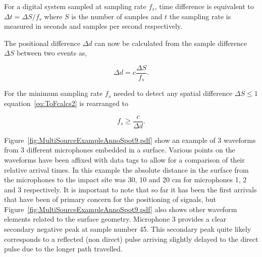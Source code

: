 For a digital system sampled at sampling rate $f_s$, time difference is equivalent to $\Delta t = \Delta S/f_s$ where $S$ is the number of samples and $t$ the sampling rate is measured in seconds and samples per second respectively.

The positional difference $\Delta d$ can now be calculated from the sample difference $\Delta S$ between two events as,

\begin{equation}\label{eq:ToFcalcs2}
\Delta d  = c \frac{\Delta S}{f_s}.
\end{equation}

For the minimum sampling rate $f_s$ needed to detect any spatial difference $\Delta S \leq 1$ equation~\ref{eq:ToFcalcs2} is rearranged to

\begin{equation}\label{eq:ToFcalcs3}
f_s  \geq \frac{c}{\Delta d}.
\end{equation}

Figure~\ref{fig:MultiSourceExampleAnnoSpot9.pdf} show an example of 3 waveforms from 3 different microphones embedded in a surface. Various points on the waveforms have been affixed with data tags to allow for a comparison of their relative arrival times. In this example the absolute distance in the surface from the microphones to the impact site was 30, 10 and 20 cm for microphones 1, 2 and 3 respectively. It is important to note that so far it has been the first arrivals that have been of primary concern for the positioning of signals, but Figure~\ref{fig:MultiSourceExampleAnnoSpot9.pdf} also shows other waveform elements related to the surface geometry. Microphone 3 provides a clear secondary negative peak at sample number 45. This secondary peak quite likely corresponds to a reflected (non direct) pulse arriving slightly delayed to the direct pulse due to the longer path travelled.

